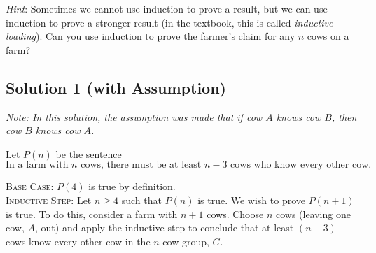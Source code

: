 \documentclass{article}
\begin{document}
    \vspace{1.5mm}
    {\small \textit{Hint}: Sometimes we cannot use induction to prove a result, but we can use induction to prove a stronger result (in the textbook, this is called \textit{inductive loading}). Can you use induction to prove the farmer's claim for any $n$ cows on a farm?}
    

\subsection*{Solution 1 (with Assumption)}
    \textit{Note: In this solution, the assumption was made that if cow $A$ knows cow $B$, then cow $B$ knows cow $A$.}

    \vspace{1.5mm}
    Let $P(n)$ be the sentence $$\text{In a farm with $n$ cows, there must be at least $n - 3$ cows who know every other cow.}$$

    \textsc{Base Case}: $P(4)$ is true by definition. \\
    \textsc{Inductive Step}:
    Let $n \ge 4$ such that $P(n)$ is true. We wish to prove $P(n + 1)$ is true. To do this, consider a farm with $n + 1$ cows. Choose $n$ cows (leaving one cow, $A$, out) and apply the inductive step to conclude that at least $(n - 3)$ cows know every other cow in the $n$-cow group, $G$.
    
\end{document}
